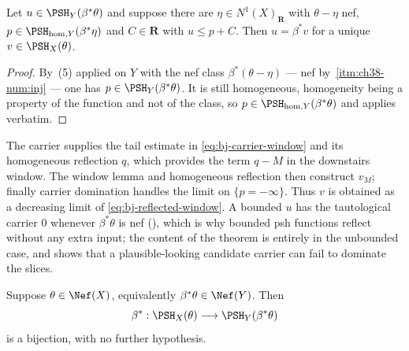 \begin{corollary}
\label{cor:ch39-carrier-other-class}
Let $u\in\PSH_Y(\beta^*\theta)$ and suppose there are
$\eta\in N^1(X)_{\mathbf R}$ with $\theta-\eta$ nef,
$p\in\PSH_{\mathrm{hom},Y}(\beta^*\eta)$ and $C\in\mathbf R$ with
$u\le p+C$.  Then $u=\beta^*v$ for a unique $v\in\PSH_X(\theta)$.
\end{corollary}

\begin{proof}
By \,(5) applied on $Y$ with the nef
class $\beta^*(\theta-\eta)$ --- nef by
\,\cref{itm:ch38-num:inj} --- one has
$p\in\PSH_Y(\beta^*\theta)$.  It is still homogeneous, homogeneity being a
property of the function and not of the class, so
$p\in\PSH_{\mathrm{hom},Y}(\beta^*\theta)$ and
 applies verbatim.
\end{proof}

\begin{remark}
\label{rem:ch39-carrier-where}
The carrier supplies the tail estimate in
\eqref{eq:bj-carrier-window} and its homogeneous reflection $q$, which
provides the term $q-M$ in the downstairs window.  The window lemma
and homogeneous reflection then construct $v_M$; finally carrier
domination handles the limit on $\{p=-\infty\}$.  Thus $v$ is obtained
as a decreasing limit of \eqref{eq:bj-reflected-window}.  A bounded
$u$ has the tautological carrier $0$ whenever $\beta^*\theta$ is nef
(), which is why bounded psh functions reflect
without any extra input; the content of the theorem is entirely in the
unbounded case, and  shows that a
plausible-looking candidate carrier can fail to dominate the slices.
\end{remark}

\begin{corollary}
\label{cor:ch39-nef-reflection}
Suppose $\theta\in\Nef(X)$, equivalently $\beta^*\theta\in\Nef(Y)$.
Then
\[
 \beta^*:\PSH_X(\theta)\longrightarrow\PSH_Y(\beta^*\theta)
\]
is a bijection, with no further hypothesis.
\end{corollary}

